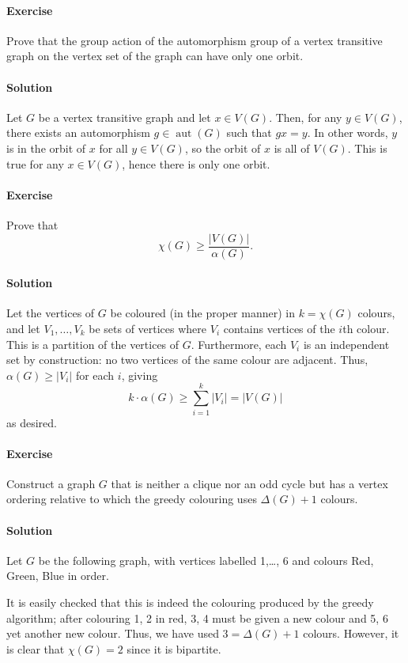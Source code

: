 \documentclass[10pt]{article}
\newcounter{prob}
\newcommand{\problem}{\stepcounter{prob}\paragraph{Exercise \arabic{prob}}}
\newcommand{\solution}{\paragraph{Solution}}
\DeclareMathOperator{\aut}{aut}
\begin{document}
    \problem Prove that the group action of the automorphism group of a vertex
    transitive graph on the vertex set of the graph can have only one orbit.

    \solution Let $G$ be a vertex transitive graph and let $x \in V(G)$. Then, for
    any $y \in V(G)$, there exists an automorphism $g \in \aut(G)$ such that $gx =
    y$. In other words, $y$ is in the orbit of $x$ for all $y \in V(G)$, so the orbit
    of $x$ is all of $V(G)$. This is true for any $x \in V(G)$, hence there is only
    one orbit.


    \problem Prove that \[
        \chi(G) \geq \frac{|V(G)|}{\alpha(G)}.
    \] 
    
    \solution Let the vertices of $G$ be coloured (in the proper manner) in $k =
    \chi(G)$ colours, and let $V_1, \dots, V_k$ be sets of vertices where $V_i$
    contains vertices of the $i$th colour. This is a partition of the vertices of
    $G$. Furthermore, each $V_i$ is an independent set by construction: no two
    vertices of the same colour are adjacent. Thus, $\alpha(G) \geq |V_i|$ for each
    $i$, giving \[
        k\cdot \alpha(G) \geq \sum_{i = 1}^k |V_i| = |V(G)|
    \] as desired.



    \problem Construct a graph $G$ that is neither a clique nor an odd cycle but has
    a vertex ordering relative to which the greedy colouring uses $\Delta(G) + 1$
    colours.

    \solution Let $G$ be the following graph, with vertices labelled 1,\dots, 6 and
    colours Red, Green, Blue in order.
    \begin{center}
    \end{center}
    It is easily checked that this is indeed the colouring produced by the greedy
    algorithm; after colouring 1, 2 in red, 3, 4 must be given a new colour and 5, 6
    yet another new colour. Thus, we have used $3 = \Delta(G) + 1$ colours. However,
    it is clear that $\chi(G) = 2$ since it is bipartite.
    
\end{document}
